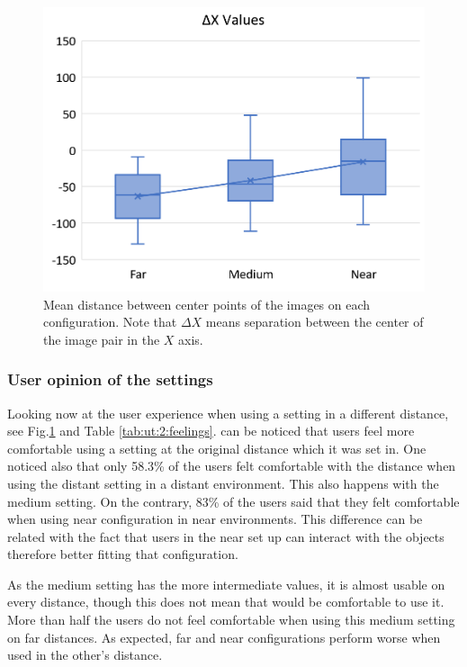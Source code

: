 \documentclass[10pt,a4paper,twocolumn,twoside]{article}
\begin{document}
	\begin{figure}[h]
		\centering
		\includegraphics[width=1\linewidth]{img/fancydelta.png}
		\caption{Mean distance between center points of the images on each configuration. Note that $\Delta X$ means separation between the center of the image pair in the $X$ axis.}
		\label{fig:ut:2:deltax}
	\end{figure}
	
	\subsubsection{User opinion of the settings }
	Looking now at the user experience when using a setting in a different distance, see Fig.\ref{fig:ut:2:deltax} and Table \ref{tab:ut:2:feelings}. can be noticed that users feel more comfortable using a setting at the original distance which it was set in. One noticed also that only 58.3\% of the users felt comfortable with the distance when using the distant setting in a distant environment. This also happens with the medium setting. On the contrary, 83\% of the users said that they felt comfortable when using near configuration in near environments. This difference can be related with the fact that users in the near set up can interact with the objects therefore better fitting that configuration. 
	
	As the medium setting has the more intermediate values, it is almost usable on every distance, though this does not mean that would be comfortable to use it. More than half the users do not feel comfortable when using this medium setting on far distances. As expected, far and near configurations perform worse when used in the other's distance.
	
\end{document}
